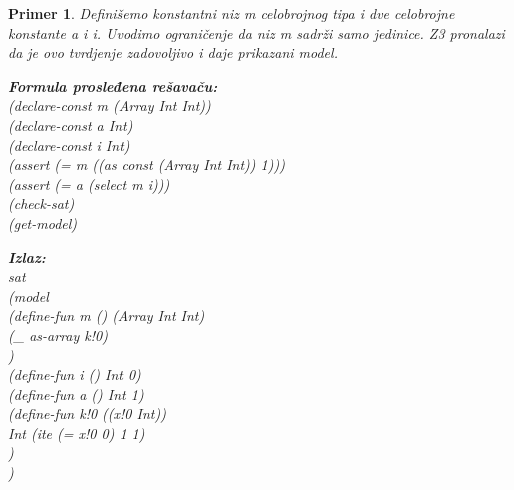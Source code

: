 \documentclass[12pt,oneside]{memoir}
\newcommand\tab[1][0.5cm]{\hspace*{#1}}
\newtheorem{primer}{Primer}
\begin{document}
\begin{primer} Definišemo konstantni niz m celobrojnog tipa i dve celobrojne konstante a i i. Uvodimo ograničenje da niz m sadrži samo jedinice. Z3 pronalazi da je ovo tvrdjenje zadovoljivo i daje prikazani model.\\
\begin{minipage}[b]{0.55\textwidth}
\vspace{0.5cm} 
\textbf{Formula prosleđena rešavaču:}
\\(declare-const m (Array Int Int))
\\(declare-const a Int)
\\(declare-const i Int)
\\(assert (= m ((as const (Array Int Int)) 1)))
\\(assert (= a (select m i)))
\\(check-sat)
\\(get-model)
\end{minipage}
\hspace{1.1cm} 
\begin{minipage}[t]{0.5\textwidth}
\vspace{-4.7cm}
\textbf{Izlaz:}
\\sat 
\\(model 
\\\tab(define-fun m () (Array Int Int) 
\\\tab\tab(\_ as-array k!0)
\\\tab) 
\\\tab(define-fun i () Int 0) 
\\\tab(define-fun a () Int 1) 
\\\tab(define-fun k!0 ((x!0 Int)) 
\\\tab\tab Int (ite (= x!0 0) 1 1)
\\\tab)
\\)
\end{minipage}
\end{primer}
\end{document}
